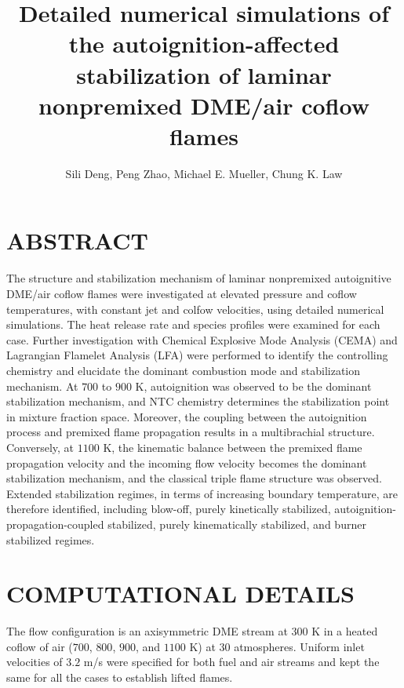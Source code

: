 \documentclass[twocolumn,10pt]{hphrc}
\title{Detailed numerical simulations of the autoignition-affected stabilization of laminar nonpremixed DME/air coflow flames}
\author{Sili Deng, Peng Zhao, Michael E. Mueller, Chung K. Law
    \affiliation{
	Department of Mechanical and Aerospace Engineering\\
	Princeton University\\
    silideng@princeton.edu
    }	
}
\begin{document}
\maketitle   %

\fontsize{9}{11}\selectfont

\section*{ABSTRACT}

The structure and stabilization mechanism of laminar nonpremixed autoignitive DME/air coflow flames were investigated at elevated pressure and coflow temperatures, with constant jet and colfow velocities, using detailed numerical simulations.  The heat release rate and species profiles were examined for each case. Further investigation with Chemical Explosive Mode Analysis (CEMA) and Lagrangian Flamelet Analysis (LFA) were performed to identify the controlling chemistry and elucidate the dominant combustion mode and stabilization mechanism.  At $700$ to $900$ K, autoignition was observed to be the dominant stabilization mechanism, and NTC chemistry determines the stabilization point in mixture fraction space.  Moreover, the coupling between the autoignition process and premixed flame propagation results in a multibrachial structure.  Conversely, at $1100$ K, the kinematic balance between the premixed flame propagation velocity and the incoming flow velocity becomes the dominant stabilization mechanism, and the classical triple flame structure was observed.  Extended stabilization regimes, in terms of increasing boundary temperature, are therefore identified, including blow-off, purely kinetically stabilized, autoignition-propagation-coupled stabilized, purely kinematically stabilized, and burner stabilized regimes.

\section*{COMPUTATIONAL DETAILS}

The flow configuration is an axisymmetric DME stream at $300$ K in a heated coflow of air ($700$, $800$, $900$, and $1100$ K) at $30$ atmospheres.  Uniform inlet velocities of $3.2$ m/s were specified for both fuel and air streams and kept the same for all the cases to establish lifted flames.
\end{document}
